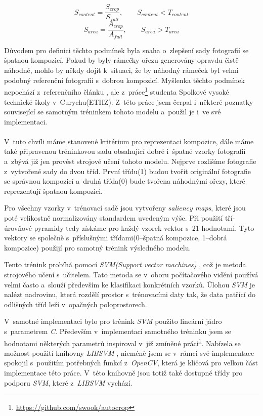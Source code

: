 \begin{equation} \label{equation:2.8}
S_{content} = \frac{S_{crop}}{S_{full}}, \qquad S_{content} < T_{content} 
\end{equation}
\begin{equation} \label{equation:2.9}
S_{area} = \frac{A_{crop}}{A_{full}}, \qquad S_{area} > T_{area}
\end{equation}

Důvodem pro definici těchto podmínek byla snaha o~zlepšení sady fotografií se špatnou kompozicí. Pokud by byly rámečky ořezu generovány opravdu čistě náhodně, mohlo by někdy dojít k~situaci, že by náhodný rámeček byl velmi podobný referenční fotografii s~dobrou kompozicí. Myšlenka těchto podmínek nepochází z~referenčního článku \cite{Fang2014}, ale z~práce\footnote{\label{fnote}\url{https://github.com/swook/autocrop}} studenta Spolkové vysoké technické školy v~Curychu(ETHZ). Z~této práce jsem čerpal i~některé poznatky související se samotným tréninkem tohoto modelu a~použil je i~ve své implementaci.

\paragraph{}
V~tuto chvíli máme stanovené kritérium pro reprezentaci kompozice, dále máme také připravenou tréninkovou sadu obsahující dobré i~špatné vzorky fotografií a~zbývá již jen provést strojové učení tohoto modelu. Nejprve rozlišíme fotografie z~vytvořené sady do dvou tříd. První třídu(1) budou tvořit originální fotografie se správnou kompozicí a~druhá třída(0) bude tvořena náhodnými ořezy, které reprezentují špatnou kompozici. 

Pro všechny vzorky v~trénovací sadě jsou vytvořeny \emph{saliency maps}, které jsou poté velikostně normalizovány standardem uvedeným výše. Při použití tří-úrovňové pyramidy tedy získáme pro každý vzorek vektor s~21 hodnotami. Tyto vektory se společně s~příslušnými třídami(0--špatná kompozice, 1--dobrá kompozice) použijí pro samotný trénink výsledného modelu.

Tento trénink probíhá pomocí \emph{SVM(Support vector machines)} \cite{LibSVM}, což je metoda strojového učení s~učitelem. Tato metoda se v~oboru počítačového vidění používá velmi často a~slouží především ke klasifikaci konkrétních vzorků. Úlohou \emph{SVM} je nalézt nadrovinu, která rozdělí prostor s~trénovacími daty tak, že data patřící do odlišných tříd leží v~opačných poloprostorech. 

V~samotné implementaci bylo pro trénink \emph{SVM} použito lineární jádro s~parametrem \emph{C}. Především v~implementaci samotného tréninku jsem se hodnotami některých parametrů inspiroval v~již zmíněné práci\textsuperscript{\ref{fnote}}. Nabízela se možnost použití knihovny \emph{LIBSVM} \cite{LibSVM}, nicméně jsem se v~rámci své implementace spokojil s~použitím potřebných funkcí z~\emph{OpenCV}, která je klíčová pro velkou část implementace této práce. V~této knihovně jsou totiž také dostupné třídy pro podporu \emph{SVM}, které z~\emph{LIBSVM} vychází.


